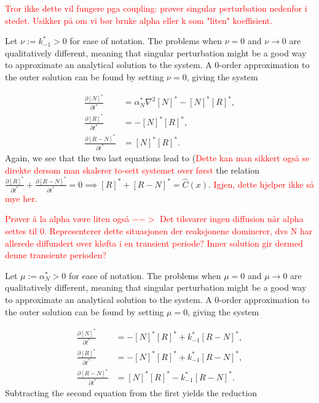 \documentclass{article}
\begin{document}
\textcolor{red}{Tror ikke dette vil fungere pga coupling: prøver singular perturbation nedenfor i stedet. Usikker på om vi bør bruke alpha eller k som "liten" koeffisient. }

Let $\nu := k_{-1}^* > 0$ for ease of notation. The problems when $\nu = 0$ and $\nu \rightarrow 0$ are qualitatively different, meaning that singular perturbation might be a good way to approximate an analytical solution to the system. A 0-order approximation to the outer solution can be found by setting $\nu = 0$, giving the system 

\begin{align}
    \frac{\partial [N]^*}{\partial t^*} &= \alpha_N^*\nabla^2[N]^*- [N]^*[R]^* ,\\
    \frac{\partial [R]^*}{\partial t^*} &= - [N]^*[R]^*,\\
    \frac{\partial [R-N]^*}{\partial t^*} &= [N]^*[R]^*.
\end{align}
Again, we see that the two last equations lead to (\textcolor{red}{Dette kan man sikkert også se direkte dersom man skalerer to-sett systemet over først} the relation $\frac{\partial [R]^*}{\partial t^*} + \frac{\partial [R-N]^*}{\partial t^*} = 0 \implies [R]^* + [R-N]^* = \hat{C}(x)$. \textcolor{red}{Igjen, dette hjelper ikke så mye her.}

\textcolor{red}{Prøver å la alpha være liten også $-->$ Det tilsvarer ingen diffusion når alpha settes til 0. Representerer dette situasjonen der reaksjonene dominerer, dvs N har allerede diffundert over kløfta i en transient periode? Inner solution gir dermed denne transiente perioden?}

Let $\mu := \alpha_N^* > 0$ for ease of notation. The problems when $\mu = 0$ and $\mu \rightarrow 0$ are qualitatively different, meaning that singular perturbation might be a good way to approximate an analytical solution to the system. A 0-order approximation to the outer solution can be found by setting $\mu = 0$, giving the system 

\begin{align}
    \frac{\partial [N]^*}{\partial t^*} &= - [N]^*[R]^* + k_{-1}^*[R-N]^*,\\
    \frac{\partial [R]^*}{\partial t^*} &= - [N]^*[R]^* + k_{-1}^*[R-N]^*,\\
    \frac{\partial [R-N]^*}{\partial t^*} &= [N]^*[R]^* - k_{-1}^*[R-N]^*.
\end{align}
Subtracting the second equation from the first yields the reduction
\end{document}
